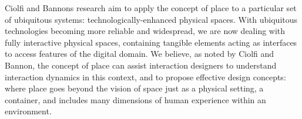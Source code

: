Ciolfi and Bannons research aim to apply the concept of place to a particular set of ubiquitous systems: technologically-enhanced physical spaces. With ubiquitous technologies becoming more reliable and widespread, we are now dealing with fully interactive physical spaces, containing tangible elements acting as interfaces to access features of the digital domain. We believe, as noted by Ciolfi and Bannon, the concept of place can assist interaction designers to understand interaction dynamics in this context, and to propose effective design concepts: where place goes beyond the vision of space just as a physical setting, a container, and includes many dimensions of human experience within an environment\autocite[p. 221]{ciolfi_space_2005}.
